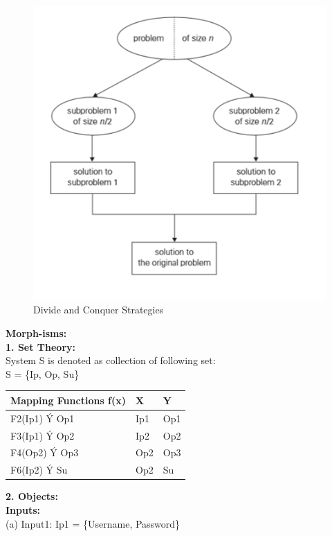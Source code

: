 \documentclass[11pt,a4paper]{report}
\begin{document}
\begin{figure}[ht]
	\centering
	\includegraphics[width=5in]{divc.png}
	\begin{center}\caption{Divide and Conquer Strategies} \end{center}
	\label{LABEL}
\end{figure}
\textbf{Morph-isms:\\}
\textbf{1. Set Theory:\\}
System S is denoted as collection of following set:\\
S = \{Ip, Op, Su\}\\
\begin{table}[h]
\centering
\begin{tabular}{|l|l|l|}
\hline
Mapping Functions f(x) & X   & Y   \\ \hline
F2(Ip1) Ý Op1          & Ip1 & Op1 \\ \hline
F3(Ip1) Ý Op2          & Ip2 & Op2 \\ \hline
F4(Op2) Ý Op3          & Op2 & Op3 \\ \hline
F6(Ip2) Ý Su           & Op2 & Su  \\ \hline
\end{tabular}
\end{table}
\textbf{2. Objects:\\}
\textbf{Inputs:\\}
(a)	Input1: Ip1 = \{Username, Password\}\\
\end{document}

